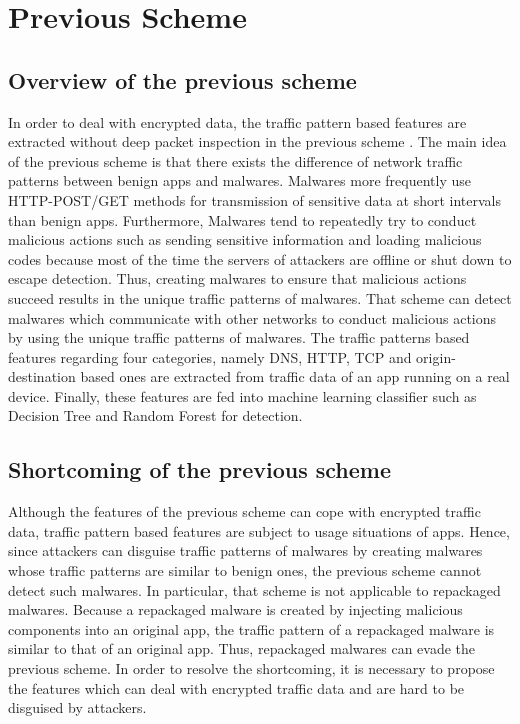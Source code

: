 \chapter{Previous Scheme}\label{sec:previous_scheme}
\section{Overview of the previous scheme} 
In order to deal with encrypted data, the traffic pattern based features are extracted without deep packet inspection in the previous scheme \cite{garg2017network}.
The main idea of the previous scheme is that there exists the difference of network traffic patterns between benign apps and malwares.
Malwares more frequently use HTTP-POST/GET methods for transmission of sensitive data at short intervals than benign apps.
Furthermore, Malwares tend to repeatedly try to conduct malicious actions such as sending sensitive information and loading malicious codes because most of the time the servers of attackers are offline or shut down to escape detection.
Thus, creating malwares to ensure that malicious actions succeed results in the unique traffic patterns of malwares.
That scheme can detect malwares which communicate with other networks to conduct malicious actions by using the unique traffic patterns of malwares.
The traffic patterns based features regarding four categories, namely DNS, HTTP, TCP and origin-destination based ones are extracted from traffic data of an app running on a real device.
Finally, these features are fed into machine learning classifier such as Decision Tree and Random Forest for detection.


\section{Shortcoming of the previous scheme } 
Although the features of the previous scheme can cope with encrypted traffic data, traffic pattern based features are subject to usage situations of apps.
Hence, since attackers can disguise traffic patterns of malwares by creating malwares whose traffic patterns are similar to benign ones, the previous scheme cannot detect such malwares.
In particular, that scheme is not applicable to repackaged malwares. 
Because a repackaged malware is created by injecting malicious components into an original app, the traffic pattern of a repackaged malware is similar to that of an original app.
Thus, repackaged malwares can evade the previous scheme.
In order to resolve the shortcoming, it is necessary to propose the features which can deal with encrypted traffic data and are hard to be disguised by attackers.  
